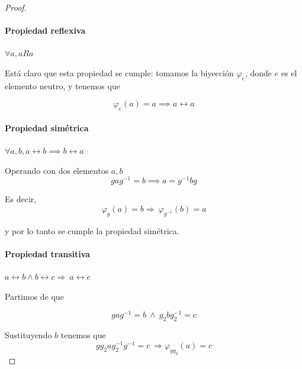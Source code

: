 \documentclass[nochap]{apuntes}
\begin{document}
\begin{proof}
 \paragraph{Propiedad reflexiva} $\forall a, aRa$
 
 Está claro que esta propiedad se cumple: tomamos la biyección $φ_{e}$, donde $e$ es el elemento neutro, y tenemos que 
 
 \[ φ_e(a)=a \implies a\rel a\]
 
 \paragraph{Propiedad simétrica} $\forall a,b, a\rel b\implies b\rel a$
 
 Operando con dos elementos $a,b$
    \[ gag^{-1}=b \implies a=g^{-1}bg \]
    
 Es decir, \[ \varphi_{g}(a)=b\Rightarrow \ \varphi_{g^{-1}}(b)=a \]
 
 y por lo tanto se cumple la propiedad simétrica.
 
 \paragraph{Propiedad transitiva} $a\rel b \wedge b\rel c \Rightarrow \ a\rel c$
 
 	Partimos de que
    
    \[ gag^{-1}=b \ \wedge \ g_{2}bg_{2}^{-1}=c\]
    
    Sustituyendo $b$ tenemos que 
    \[ gg_{2}ag_{2}^{-1}g^{-1}=c\ \Rightarrow \varphi_{gg_{2}}(a)=c \]

\end{proof}
\end{document}
